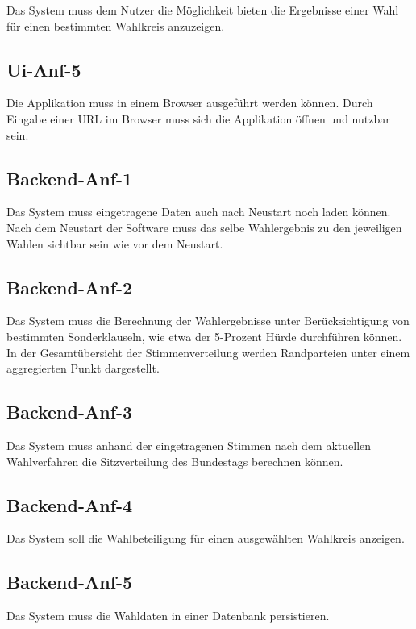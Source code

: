 \documentclass[a4paper]{scrreprt}
\begin{document}
Das System muss dem Nutzer die Möglichkeit bieten die Ergebnisse einer Wahl für einen bestimmten Wahlkreis anzuzeigen. 

\subsection{Ui-Anf-5}

Die Applikation muss in einem Browser ausgeführt werden können. Durch Eingabe einer URL im Browser muss sich die Applikation öffnen und nutzbar sein.

\subsection{Backend-Anf-1}

Das System muss eingetragene Daten auch nach Neustart noch laden können. Nach dem Neustart der Software muss das selbe Wahlergebnis zu den jeweiligen Wahlen sichtbar sein wie vor dem Neustart. 

\subsection{Backend-Anf-2}

Das System muss die Berechnung der Wahlergebnisse unter Berücksichtigung von bestimmten Sonderklauseln, wie etwa der 5-Prozent Hürde durchführen können. In der Gesamtübersicht der Stimmenverteilung werden Randparteien unter einem aggregierten Punkt dargestellt.  

\subsection{Backend-Anf-3}

Das System muss anhand der eingetragenen Stimmen nach dem aktuellen Wahlverfahren die Sitzverteilung des Bundestags berechnen können.

\subsection{Backend-Anf-4}

Das System soll die Wahlbeteiligung für einen ausgewählten Wahlkreis anzeigen.

\subsection{Backend-Anf-5}

Das System muss die Wahldaten in einer Datenbank persistieren.
\end{document}
